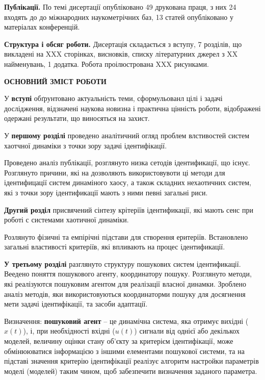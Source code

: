 \documentclass[a4paper,12pt]{atuaref}
\newcommand{\xsect}[1]{\medskip\begin{center}\textbf{#1}\end{center}\medskip\penalty10000}
\begin{document}
\smallskip
\textbf{Публікації.}
По темі дисертації опубліковано
49 друкована праця,
з них
24 входять до до міжнародних наукометрічних баз,
13 статей опубліковано у матеріалах конференцій.

\smallskip
\textbf{Структура і обсяг роботи.}
Дисертація складається з вступу, 7 розділів, що викладені на
XXX сторінках, висновків, списку літературних джерел з
XX найменувань,
1 додатка.
Робота проілюстрована XXX рисунками.


\xsect{ОСНОВНИЙ ЗМІСТ РОБОТИ}

У \textbf{вступі} обґрунтовано актуальність теми,
сформульованл цілі і задачі дослідження,
відзначені наукова новизна і практична цінність роботи, відображені
одержані результати, що виносяться на захист.

У \textbf{першому розділі}
проведено аналітичний огляд проблем
влстивостей систем хаотчної динаміки
з точки зору задачі ідентифікації.

Проведено аналіз публікації,
розглянуто низка сетодів ідентификації,
що існує.
Розглянуто причини,
які на дозволяють використовувоти ці методи для
ідентифицації систем динаміного хаосу,
а також складних нехаотичних систем,
які з точки зору ідентификації
мають з ними певні загальні риси.





\textbf{Другий розділ}
присвячений
сінтезу крітеріїв ідентификації,
які мають сенс при роботі с системами
хаотичної динаміки.

Розлянуто фізичні та емпірічні підстави для створення
еритеріїв. Встановлено
загальні властивості критеріїв,
які впливають на процес ідентификації.





\medskip

\textbf{У третьому розділі}
разглянуто структуру пошукових систем
ідентификації.
Веедено поняття пошукового агенту,
координатору пошуку.
Розглянуто методи,
які реалізуются пошуковим агентом для
реалізації власної динамки.
Зроблено аналіз методів, яки використовуються
координаторми пошуку для досягнення мети
задачі ідентифікації, та засоби адаптації.

Визначення:
\textbf{пошуковий агент} -- це динамічна система, яка отримує вихідні ($x(t)$),
і, при необхідності вхідні ($u(t)$) сигнали від однієї або декількох моделей,
величину оцінки стану об'єкту за критерієм ідентифікації,
може обмінююватися інформацією з іншими елементами пошукової системи,
та на підставі значення критерію
ідентифікації реалізує алгоритм настройки параметрів моделі (моделей) таким
чином, щоб забезпечити визначення заданого параметра.
\end{document}
